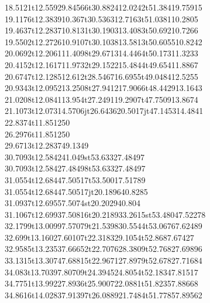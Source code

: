 \documentclass[draft]{article}
\makeatletter
\DeclareRobustCommand{\_}{%
  \ifmmode \nfss@text{\textunderscore}\else \BreakableUnderscore \fi}
\makeatother
\begin{document}
{{18.5121}t{12.5592}{9.84566}t{30.8824}{12.0242}t{51.3841}{9.75915}\\%
{19.1176}t{12.3839}{10.367}t{30.5363}{12.7163}t{51.0381}{10.2805}\\%
{19.4637}t{12.2837}{10.8131}t{30.1903}{13.4083}t{50.692}{10.7266}\\%
{19.5502}t{12.2726}{10.9107}t{30.1038}{13.5813}t{50.6055}{10.8242}\\%
{20.0692}t{12.2061}{11.4098}t{29.6713}{14.4464}t{50.173}{11.3233}\\%
{20.4152}t{12.1617}{11.9732}t{29.1522}{15.4844}t{49.654}{11.8867}\\%
{20.6747}t{12.1285}{12.612}t{28.5467}{16.6955}t{49.0484}{12.5255}\\%
{20.9343}t{12.0952}{13.2508}t{27.9412}{17.9066}t{48.4429}{13.1643}\\%
{21.0208}t{12.0841}{13.954}t{27.2491}{19.2907}t{47.7509}{13.8674}\\%
{21.1073}t{12.073}{14.5706}jt{26.6436}{20.5017}jt{47.1453}{14.4841}\\%
{22.8374}t{11.8512}{50}\\%
{26.2976}t{11.8512}{50}\\%
{29.6713}t{12.2837}{49.1349}\\%
{30.7093}t{12.5842}{41.049}st{53.6332}{7.48497}\\%
{30.7093}t{12.5842}{7.48498}t{53.6332}{7.48497}\\%
{31.0554}t{12.6844}{7.50517}t{53.5001}{7.51789}\\%
{31.0554}t{12.6844}{7.50517}jt{20.1896}{40.8285}\\%
{31.0937}t{12.6955}{7.5074}st{20.2029}{40.804}\\%
{31.1067}t{12.6993}{7.50816}t{20.2189}{33.2615}st{53.4804}{7.52278}\\%
{32.1799}t{13.0099}{7.57079}t{21.5398}{30.5544}t{53.0676}{7.62489}\\%
{32.699}t{13.1602}{7.60107}t{22.3183}{29.1054}t{52.868}{7.67427}\\%
{32.9585}t{13.2353}{7.66652}t{22.7076}{28.3809}t{52.7682}{7.69896}\\%
{33.1315}t{13.3074}{7.68815}t{22.9671}{27.8979}t{52.6782}{7.71684}\\%
{34.083}t{13.7039}{7.80709}t{24.3945}{24.8054}t{52.1834}{7.81517}\\%
{34.7751}t{13.9922}{7.8936}t{25.9007}{22.0881}t{51.8235}{7.88668}\\%
{34.8616}t{14.0283}{7.91397}t{26.0889}{21.7484}t{51.7785}{7.89562}\\%
}
\end{document}
